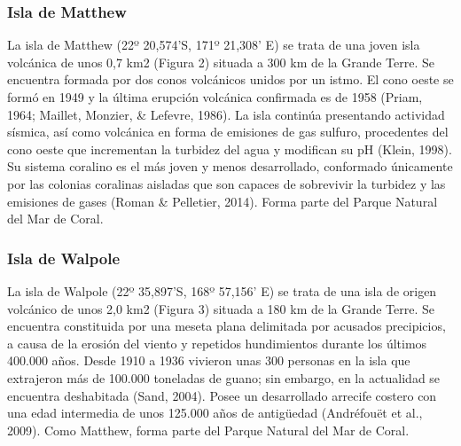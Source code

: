 \documentclass[a4paper, 11pt]{article}
\begin{document}
\subsubsection{Isla de Matthew}
La isla de Matthew (22º 20,574’S, 171º 21,308’ E) se trata de una joven isla volcánica de unos 0,7 km2 (Figura 2) situada a 300 km de la Grande Terre. Se encuentra formada por dos conos volcánicos unidos por un istmo. El cono oeste se formó en 1949 y la última erupción volcánica confirmada es de 1958 (Priam, 1964; Maillet, Monzier, & Lefevre, 1986). La isla continúa presentando actividad sísmica, así como volcánica en forma de emisiones de gas sulfuro, procedentes del cono oeste que incrementan la turbidez del agua y modifican su pH (Klein, 1998). Su sistema coralino es el más joven y menos desarrollado, conformado únicamente por las colonias coralinas aisladas que son capaces de sobrevivir la turbidez y las emisiones de gases (Roman & Pelletier, 2014). Forma parte del Parque Natural del Mar de Coral.
\subsubsection{Isla de Walpole}
La isla de Walpole (22º 35,897’S, 168º 57,156’ E) se trata de una isla de origen volcánico de unos 2,0 km2 (Figura 3) situada a 180 km de la Grande Terre. Se encuentra constituida por una meseta plana delimitada por acusados precipicios, a causa de la erosión del viento y repetidos hundimientos durante los últimos 400.000 años. Desde 1910 a 1936 vivieron unas 300 personas en la isla que extrajeron más de 100.000 toneladas de guano; sin embargo, en la actualidad se encuentra deshabitada (Sand, 2004). Posee un desarrollado arrecife costero con una edad intermedia de unos 125.000 años de antigüedad (Andréfouët et al., 2009). Como Matthew, forma parte del Parque Natural del Mar de Coral. 
\end{document}
